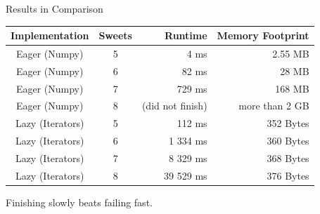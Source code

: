 
\begin{frame}{Results in Comparison}
%
\begin{center}
\begin{tabular}{cc|rr}
	\textbf{Implementation} & \textbf{Sweets} & \textbf{Runtime} & \textbf{Memory Footprint} \\ \hline %
	Eager (Numpy)           &              5  &             4 ms &   2.55 MB \\
	Eager (Numpy)           &              6  &            82 ms &  28 MB \\
	Eager (Numpy)           &              7  &           729 ms & 168 MB \\
	Eager (Numpy)           &              8  & (did not finish) & more than 2 GB \\ 
\hline
	Lazy (Iterators)        &              5  &           112 ms & 352 Bytes \\
	Lazy (Iterators)        &              6  &         1 334 ms & 360 Bytes \\
	Lazy (Iterators)        &              7  &         8 329 ms & 368 Bytes \\
	Lazy (Iterators)        &              8  &        39 529 ms & 376 Bytes 
\end{tabular}
\end{center}
%
\begin{hintbox}
Finishing slowly beats failing fast.
\end{hintbox}
%
\end{frame}

